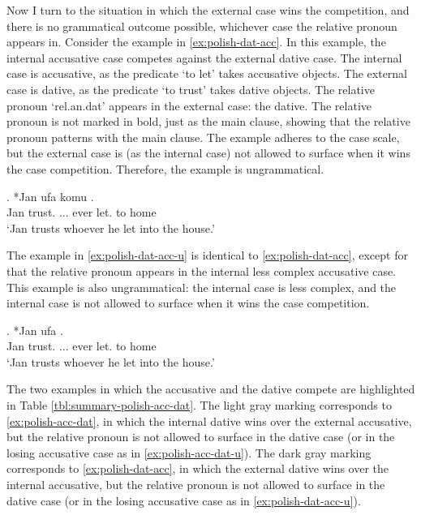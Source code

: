 Now I turn to the situation in which the external case wins the competition, and there is no grammatical outcome possible, whichever case the relative pronoun appears in.
Consider the example in \ref{ex:polish-dat-acc}. In this example, the internal accusative case competes against the external dative case.
The internal case is accusative, as the predicate  `to let' takes accusative objects.
The external case is dative, as the predicate  `to trust' takes dative objects.
The relative pronoun  `\ac{rel}.\ac{an}.\ac{dat}' appears in the external case: the dative. The relative pronoun is not marked in bold, just as the main clause, showing that the relative pronoun patterns with the main clause.
The example adheres to the case scale, but the external case is (as the internal case) not allowed to surface when it wins the case competition. Therefore, the example is ungrammatical.

\exg. *Jan ufa komu    .\\
Jan trust.\scsub{[dat]} ... ever let.\scsub{[acc]} to home\\
`Jan trusts whoever he let into the house.' \label{ex:polish-dat-acc}

The example in \ref{ex:polish-dat-acc-u} is identical to \ref{ex:polish-dat-acc}, except for that the relative pronoun appears in the internal less complex accusative case. This example is also ungrammatical: the internal case is less complex, and the internal case is not allowed to surface when it wins the case competition.

\exg. *Jan ufa     .\\
Jan trust.\scsub{[dat]} ... ever let.\scsub{[acc]} to home\\
`Jan trusts whoever he let into the house.' \label{ex:polish-dat-acc-u}

The two examples in which the accusative and the dative compete are highlighted in Table \ref{tbl:summary-polish-acc-dat}.
The light gray marking corresponds to \ref{ex:polish-acc-dat}, in which the internal dative wins over the external accusative, but the relative pronoun is not allowed to surface in the dative case (or in the losing accusative case as in \ref{ex:polish-acc-dat-u}).
The dark gray marking corresponds to \ref{ex:polish-dat-acc}, in which the external dative wins over the internal accusative, but the relative pronoun is not allowed to surface in the dative case (or in the losing accusative case as in \ref{ex:polish-dat-acc-u}).


